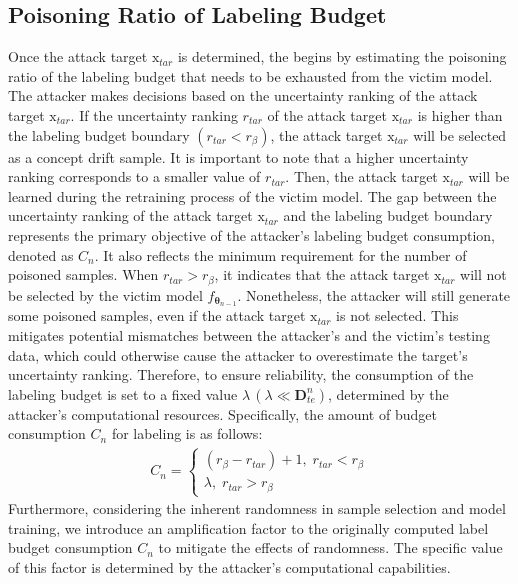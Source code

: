 \subsection{Poisoning Ratio of Labeling Budget}
\label{Sec: Surrogate Model Training}
Once the attack target $\bm{\mathrm{x}}_{tar}$ is determined, the \pandora begins by estimating the poisoning ratio of the labeling budget that needs to be exhausted from the victim model.
The attacker makes decisions based on the uncertainty ranking of the attack target $\bm{\mathrm{x}}_{tar}$.
If the uncertainty ranking $r_{tar}$ of the attack target $\bm{\mathrm{x}}_{tar}$ is higher than the labeling budget boundary $(r_{tar} < r_{\beta})$, the attack target $\bm{\mathrm{x}}_{tar}$ will be selected as a concept drift sample.
It is important to note that a higher uncertainty ranking corresponds to a smaller value of $r_{tar}$.
Then, the attack target $\bm{\mathrm{x}}_{tar}$ will be learned during the retraining process of the victim model.
The gap between the uncertainty ranking of the attack target $\bm{\mathrm{x}}_{tar}$ and the labeling budget boundary represents the primary objective of the attacker’s labeling budget consumption, denoted as $C_{n}$.
It also reflects the minimum requirement for the number of poisoned samples.
When $r_{tar} > r_{\beta}$, it indicates that the attack target $\bm{\mathrm{x}}_{tar}$ will not be selected by the victim model $f_{\bm{\theta}_{n-1}}$.
Nonetheless, the attacker will still generate some poisoned samples, even if the attack target $\bm{\mathrm{x}}_{tar}$ is not selected.
This mitigates potential mismatches between the attacker’s and the victim’s testing data, which could otherwise cause the attacker to overestimate the target’s uncertainty ranking.
Therefore, to ensure reliability, the consumption of the labeling budget is set to a fixed value $\lambda \, (\lambda \ll \bm{D}_{te}^{n})$, determined by the attacker’s computational resources.
Specifically, the amount of budget consumption $C_{n}$ for labeling is as follows:
\begin{align}
	C_{n} =
	\begin{cases} 
		(r_{\beta}-r_{tar}) + 1, \; r_{tar} < r_{\beta} \\
		\lambda , \; r_{tar} > r_{\beta}
	\end{cases}
\end{align}
Furthermore, considering the inherent randomness in sample selection and model training, we introduce an amplification factor to the originally computed label budget consumption $C_{n}$ to mitigate the effects of randomness.
The specific value of this factor is determined by the attacker's computational capabilities.

